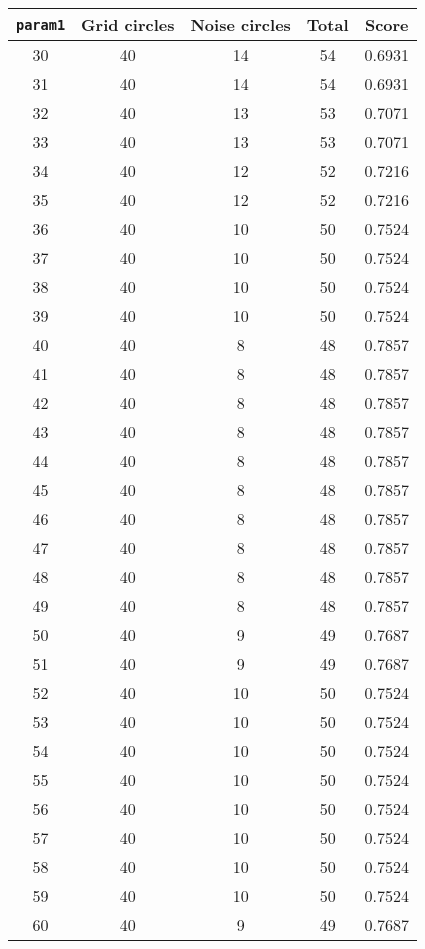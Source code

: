 \documentclass[letterpaper, 12pt]{article}
\begin{document}
\begin{longtable}{|c|c|c|c|c|}
\hline
\textbf{\texttt{param1}} & \textbf{Grid circles} & \textbf{Noise circles} & \textbf{Total} & \textbf{Score} \\
\hline
30 & 40 & 14 & 54 & 0.6931 \\
\hline
31 & 40 & 14 & 54 & 0.6931 \\
\hline
32 & 40 & 13 & 53 & 0.7071 \\
\hline
33 & 40 & 13 & 53 & 0.7071 \\
\hline
34 & 40 & 12 & 52 & 0.7216 \\
\hline
35 & 40 & 12 & 52 & 0.7216 \\
\hline
36 & 40 & 10 & 50 & 0.7524 \\
\hline
37 & 40 & 10 & 50 & 0.7524 \\
\hline
38 & 40 & 10 & 50 & 0.7524 \\
\hline
39 & 40 & 10 & 50 & 0.7524 \\
\hline
40 & 40 & 8 & 48 & 0.7857 \\
\hline
41 & 40 & 8 & 48 & 0.7857 \\
\hline
42 & 40 & 8 & 48 & 0.7857 \\
\hline
43 & 40 & 8 & 48 & 0.7857 \\
\hline
44 & 40 & 8 & 48 & 0.7857 \\
\hline
45 & 40 & 8 & 48 & 0.7857 \\
\hline
46 & 40 & 8 & 48 & 0.7857 \\
\hline
47 & 40 & 8 & 48 & 0.7857 \\
\hline
48 & 40 & 8 & 48 & 0.7857 \\
\hline
49 & 40 & 8 & 48 & 0.7857 \\
\hline
50 & 40 & 9 & 49 & 0.7687 \\
\hline
51 & 40 & 9 & 49 & 0.7687 \\
\hline
52 & 40 & 10 & 50 & 0.7524 \\
\hline
53 & 40 & 10 & 50 & 0.7524 \\
\hline
54 & 40 & 10 & 50 & 0.7524 \\
\hline
55 & 40 & 10 & 50 & 0.7524 \\
\hline
56 & 40 & 10 & 50 & 0.7524 \\
\hline
57 & 40 & 10 & 50 & 0.7524 \\
\hline
58 & 40 & 10 & 50 & 0.7524 \\
\hline
59 & 40 & 10 & 50 & 0.7524 \\
\hline
60 & 40 & 9 & 49 & 0.7687 \\

\end{longtable}
\end{document}
